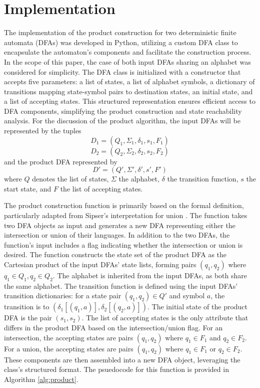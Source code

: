 \documentclass[conference]{IEEEtran}
\begin{document}
\section{Implementation}
The implementation of the product construction for two deterministic finite automata (DFAs) was developed in Python, utilizing a custom DFA class to encapsulate the automaton's components and facilitate the construction process. In the scope of this paper, the case of both input DFAs sharing an alphabet was considered for simplicity. The DFA class is initialized with a constructor that accepts five parameters: a list of states, a list of alphabet symbols, a dictionary of transitions mapping state-symbol pairs to destination states, an initial state, and a list of accepting states. This structured representation ensures efficient access to DFA components, simplifying the product construction and state reachability analysis. For the discussion of the product algorithm, the input DFAs will be represented by the tuples
\[ D_1 = (Q_1, \Sigma_1, \delta_1, s_1, F_1) \]
\[ D_2 = (Q_2, \Sigma_2, \delta_2, s_2, F_2) \]
and the product DFA represented by
\[ D' = (Q', \Sigma', \delta', s', F') \]
where $Q$ denotes the list of states, $\Sigma$ the alphabet, $\delta$ the transition function, $s$ the start state, and $F$ the list of accepting states. 

The product construction function is primarily based on the formal definition, particularly adapted from Sipser's interpretation for union \cite{b1}. The function takes two DFA objects as input and generates a new DFA representing either the intersection or union of their languages. In addition to the two DFAs, the function's input includes a flag indicating whether the intersection or union is desired. The function constructs the state set of the product DFA as the Cartesian product of the input DFAs' state lists, forming pairs $(q_1, q_2)$ where $q_1 \in Q_1, q_2 \in Q_2$. The alphabet is inherited from the input DFAs, as both share the same alphabet. The transition function is defined using the input DFAs' transition dictionaries: for a state pair $(q_1, q_2) \in Q'$ and symbol $a$, the transition is to $(\delta_1[(q_1, a)], \delta_2[(q_2, a)])$. The initial state of the product DFA is the pair $(s_1, s_2)$. The list of accepting states is the only attribute that differs in the product DFA based on the intersection/union flag. For an intersection, the accepting states are pairs $(q_1, q_2)$ where $q_1 \in F_1$ and $q_2 \in F_2$. For a union, the accepting states are pairs $(q_1, q_2)$ where $q_1 \in F_1$ or $q_2 \in F_2$. These components are then assembled into a new DFA object, leveraging the class's structured format. The psuedocode for this function is provided in Algorithm \ref{alg:product}.
\end{document}
